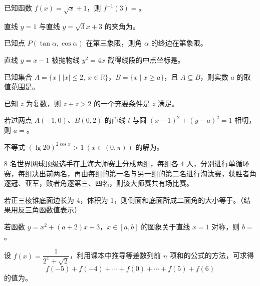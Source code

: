 \begin{question}
已知函数 $f(x)=\sqrt{x}+1$，则 $f^{-1}(3)=$\underline{\qquad}。

\end{question}
\begin{question}
直线 $y=1$ 与直线 $y=\sqrt3x+3$ 的夹角为\underline{\qquad}。

\end{question}
\begin{question}
已知点 $P(\tan\alpha,\cos\alpha)$ 在第三象限，则角 $\alpha$ 的终边在第\underline{\qquad}象限。

\end{question}
\begin{question}
直线 $y=x-1$ 被抛物线 $y^2=4x$ 截得线段的中点坐标是\underline{\qquad}。

\end{question}
\begin{question}
已知集合 $A=\{x\mid |x|\leqslant 2,\ x\in\mathbb R\}$，$B=\{x\mid x\geqslant a\}$，且 $A\subseteq B$，则实数 $a$ 的取值范围是\underline{\qquad}。

\end{question}
\begin{question}
已知 $z$ 为复数，则 $z+\overline z>2$ 的一个充要条件是 $z$ 满足\underline{\qquad}。

\end{question}
\begin{question}
若过两点 $A(-1,0)$、$B(0,2)$ 的直线 $l$ 与圆 $(x-1)^2+(y-a)^2=1$ 相切，则 $a=$\underline{\qquad}。

\end{question}
\begin{question}
不等式 $(\lg 20)^{2\cos x}>1\ (x\in(0,\pi))$ 的解为\underline{\qquad}。

\end{question}
\begin{question}
8 名世界网球顶级选手在上海大师赛上分成两组，每组各 4 人，分别进行单循环赛，每组决出前两名，再由每组的第一名与另一组的第二名进行淘汰赛，获胜者角逐冠、亚军，败者角逐第三、四名，则该大师赛共有\underline{\qquad}场比赛。

\end{question}
\begin{question}
若正三棱锥底面边长为 4，体积为 1，则侧面和底面所成二面角的大小等于\underline{\qquad}。（结果用反三角函数值表示）

\end{question}
\begin{question}
若函数 $y=x^2+(a+2)x+3$，$x\in[a,b]$ 的图象关于直线 $x=1$ 对称，则 $b=$\underline{\qquad}。

\end{question}
\begin{question}
设 $f(x)=\dfrac{1}{2^x+\sqrt2}$，利用课本中推导等差数列前 $n$ 项和的公式的方法，可求得
\nopagebreak[4]
\[
f(-5)+f(-4)+\cdots+f(0)+\cdots+f(5)+f(6)
\]
的值为\underline{\qquad}。

\end{question}

